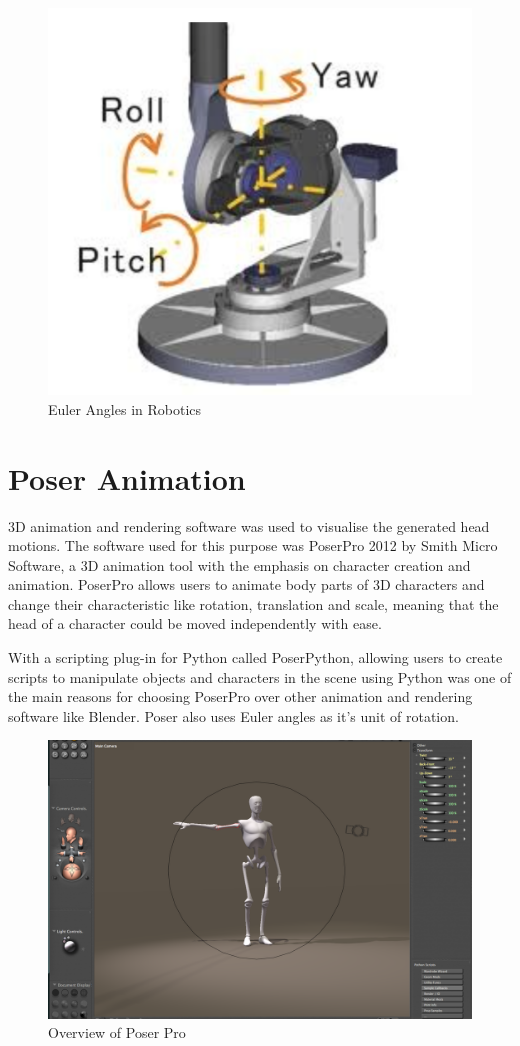 \documentclass[bsc,frontabs,twoside,singlespacing,parskip]{infthesis}
\begin{document}
\begin{figure}[h!]
	\centering
	\includegraphics[width=.5\textwidth]{euler_angles.png}
	\caption{Euler Angles in Robotics}
\end{figure}


\section{Poser Animation}

3D animation and rendering software was used to visualise the generated head motions. The software used for this purpose was PoserPro 2012 by Smith Micro Software, a 3D animation tool with the emphasis on character creation and animation. PoserPro allows users to animate body parts of 3D characters and change their characteristic like rotation, translation and scale, meaning that the head of a character could be moved independently with ease.

With a scripting plug-in for Python called PoserPython, \cite{poser_python} allowing users to create scripts to manipulate objects and characters in the scene using Python was one of the main reasons for choosing PoserPro over other animation and rendering software like Blender. Poser also uses Euler angles as it's unit of rotation.


\begin{figure}
	\centering
		\includegraphics[width=1.0\textwidth]{poser.png}
		\caption{Overview of Poser Pro}
\end{figure}
\end{document}
